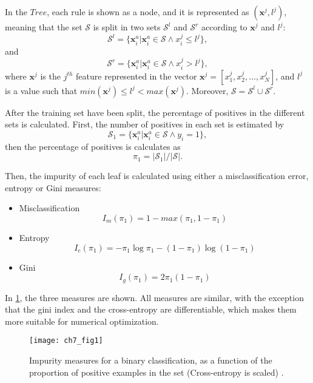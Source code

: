 In the $Tree$, each rule is shown as a node, and it is represented as $(\mathbf{x}^j,l^j)$, meaning 
that the 
set $\mathcal{S}$ is split in two sets $\mathcal{S}^l$ and $\mathcal{S}^r$ according to 
$\mathbf{x}^j$ and $l^j$:
\begin{equation}
  \mathcal{S}^l = \{\mathbf{x}^a_i \vert \mathbf{x}^a_i \in \mathcal{S} \wedge x^j_i \le l^j \},
\end{equation}
and
\begin{equation}
  \mathcal{S}^r = \{\mathbf{x}^a_i \vert \mathbf{x}^a_i \in \mathcal{S} \wedge x^j_i > l^j \},
\end{equation}
where $\mathbf{x}^j$ is the $j^{th}$ feature represented in the vector 
$\mathbf{x}^j=[x_1^j,x_2^j,...,x_N^j]$, and $l^j$ is a value such that $min(\mathbf{x}^j) \le l^j < 
max(\mathbf{x}^j)$. Moreover, $\mathcal{S} = \mathcal{S}^l \cup \mathcal{S}^r$.

After the training set have been split, the percentage of positives in the different sets is 
calculated. First, the number of positives in each set is estimated by
\begin{equation}
 \mathcal{S}_1 = \{\mathbf{x}^a_i \vert \mathbf{x}_i^a \in \mathcal{S} \wedge y_i =1 \},
\end{equation}
then the percentage of positives is calculates as
\begin{equation}
 \pi_1=\vert \mathcal{S}_1 \vert / \vert \mathcal{S} \vert.
\end{equation}

Then, the impurity of each leaf is calculated using either a misclassification error, 
entropy or Gini measures:
\begin{itemize}
 \item  Misclassification
 \begin{equation}
 I_m(\pi_1)=1-max(\pi_1,1-\pi_1)
 \end{equation}
 
 \item Entropy
 \begin{equation}
 I_e(\pi_1)=-\pi_1\log \pi_1 -(1-\pi_1) \log (1-\pi_1)
 \end{equation}
 
 \item Gini
 \begin{equation}
 I_g(\pi_1)=2\pi_1(1-\pi_1)
 \end{equation}
\end{itemize}

In \figurename{ \ref{fig:7:impurity}}, the three measures are shown. All measures are similar, with 
the exception that the gini index and the cross-entropy are differentiable, which makes them
more suitable for numerical optimization.
\begin{figure}[t!]
\texttt{[image: ch7\_fig1]}
\caption{Impurity measures for a binary classification, as a function of the proportion of
positive examples in the set (Cross-entropy is scaled) \citep{Hastie2009}.}
\label{fig:7:impurity}
\end{figure} 

